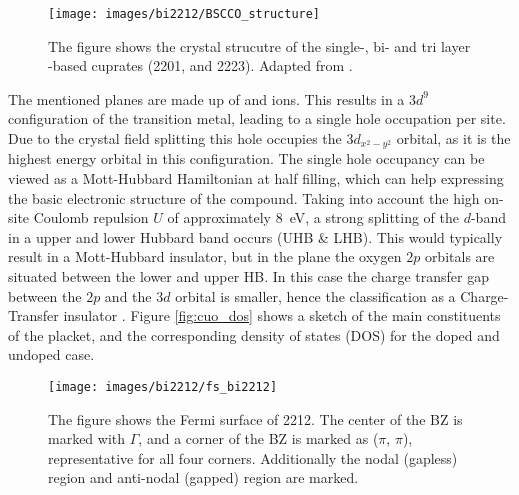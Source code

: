 \begin{figure}
	\centering
	\texttt{[image: images/bi2212/BSCCO\_structure]}
	\caption{The figure shows the crystal strucutre of the single-, bi- and tri layer -based cuprates  (2201,  and 2223). Adapted from \cite{nazargulov_english_2009}.}
	\label{fig:bscco_structure}
\end{figure}


The mentioned  planes are made up of  and  ions.
This results in a $3d^9$ configuration of the transition metal, leading to a single hole occupation per site.
Due to the crystal field splitting this hole occupies the $3d_{x^2-y^2}$ orbital, as it is the highest energy orbital in this configuration.
The single hole occupancy can be viewed as a Mott-Hubbard Hamiltonian at half filling, which can help expressing the basic electronic structure of the compound.
Taking into account the high on-site Coulomb repulsion $U$ of approximately \qty{8}{\electronvolt}, a strong splitting of the $d$-band in a upper and lower Hubbard band occurs (UHB \& LHB).
This would typically result in a Mott-Hubbard insulator, but in the  plane the oxygen $2p$ orbitals are situated between the lower and upper HB.
In this case the charge transfer gap between the  $2p$ and the  $3d$ orbital is smaller, hence the classification as a Charge-Transfer insulator \cite{zaanen_band_1985,zegrodnik_superconductivity_2019}. 
Figure \ref{fig:cuo_dos} shows a sketch of the main constituents of the  placket, and the corresponding density of states (DOS) for the doped and undoped case.

\begin{figure}
	\centering
	\texttt{[image: images/bi2212/fs\_bi2212]}
	\caption{The figure shows the Fermi surface of 2212. The center of the BZ is marked with $\Gamma$, and a corner of the BZ is marked as ($\pi$, $\pi$), representative for all four corners. Additionally the nodal (gapless) region and anti-nodal (gapped) region are marked.}
	\label{fig:fsbi2212}
\end{figure}


